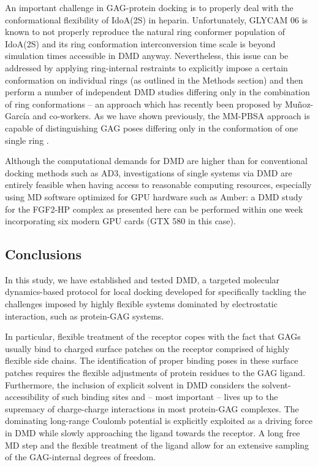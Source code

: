 An important challenge in GAG-protein docking is to properly deal with the
conformational flexibility of IdoA(2S) in
heparin\cite{Mulloy_dyn_conf_heparin_2000, barbero_jacs_2005}. Unfortunately,
GLYCAM 06 is known to not properly reproduce the natural ring conformer
population of IdoA(2S) \cite{gandhi_idoa2s_2010} and its ring conformation
interconversion time scale is beyond simulation times accessible in DMD
anyway{\cite{almond_jacs_2010}}. Nevertheless, this issue can be addressed by
applying ring-internal restraints to explicitly impose a certain conformation on
individual rings (as outlined in the Methods section) and then perform a number
of independent DMD studies differing only in the combination of ring
conformations -- an approach which has recently been proposed by Mu\~noz-
Garc\'ia and co-workers{\cite{conf_idoa_timeavg_restraints_2013}}. As we have
shown previously, the MM-PBSA approach is capable of distinguishing GAG poses
differing only in the conformation of one single
ring \cite{Samsonov_rings_cr_2013}.

Although the computational demands for DMD are higher than for conventional
docking methods such as AD3, investigations of single systems via DMD are
entirely feasible when having access to reasonable computing resources,
especially using MD software optimized for GPU hardware such as Amber: a DMD
study for the FGF2-HP complex as presented here can be performed within one week
incorporating six modern GPU cards (GTX 580 in this case).

\subsection{Conclusions}

In this study, we have established and tested DMD, a targeted molecular
dynamics-based protocol for local docking developed for specifically tackling
the challenges imposed by highly flexible systems dominated by electrostatic
interaction, such as protein-GAG systems.

In particular, flexible treatment of the receptor copes with the fact that GAGs
usually bind to charged surface patches on the receptor comprised of highly
flexible side chains. The identification of proper binding poses in these
surface patches requires the flexible adjustments of protein residues to the GAG
ligand. Furthermore, the inclusion of explicit solvent in DMD considers the
solvent-accessibility of such binding sites and -- most important -- lives up to
the supremacy of charge-charge interactions in most protein-GAG complexes. The
dominating long-range Coulomb potential is explicitly exploited as a driving
force in DMD while slowly approaching the ligand towards the receptor. A long
free MD step and the flexible treatment of the ligand allow for an extensive
sampling of the GAG-internal degrees of freedom.

